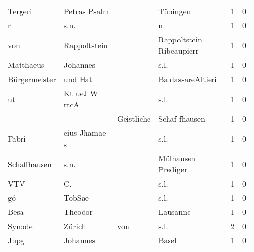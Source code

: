 \documentclass[10pt,a4paper,landscape]{article}
\begin{document}
\begin{longtable}{llllrr}
                  Tergeri &                       Petras Psalm &             &                                    Tübingen &          1 &         0 \\
                        r &                               s.n. &             &                                           n &          1 &         0 \\
                      von &                       Rappoltstein &             &                    Rappoltstein Ribeaupierr &          1 &         0 \\
                Matthaeus &                           Johannes &             &                                        s.l. &          1 &         0 \\
            Bürgermeister &                            und Hat &             &                           BaldassareAltieri &          1 &         0 \\
                       ut &                      Kt ueJ W rtcA &             &                                        s.l. &          1 &         0 \\
                          &                                    &  Geistliche &                               Schaf fhausen &          1 &         0 \\
                    Fabri &                      eius Jhamae s &             &                                        s.l. &          1 &         0 \\
             Schaffhausen &                               s.n. &             &                          Mülhausen Prediger &          1 &         0 \\
                      VTV &                                 C. &             &                                        s.l. &          1 &         0 \\
                       gö &                             TobSae &             &                                        s.l. &          1 &         0 \\
                     Besä &                            Theodor &             &                                    Lausanne &          1 &         0 \\
                   Synode &                             Zürich &         von &                                        s.l. &          2 &         0 \\
                     Jupg &                           Johannes &             &                                       Basel &          1 &         0 \\

\end{longtable}
\end{document}
